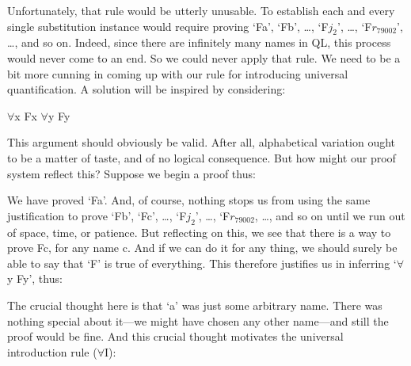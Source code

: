 Unfortunately, that rule would be utterly unusable. To establish each and every single substitution instance would require proving ‘Fa’, ‘Fb’, \ldots , ‘F$j_2$’, \ldots , ‘F$r_{79002}$’, \ldots , and so on. Indeed, since there are infinitely many names in QL, this process would never come to an end. So we could never apply that rule. We need to be a bit more cunning in coming up with our rule for introducing universal quantification. A solution will be inspired by considering:
\begin{center}
$\forall$x Fx \therefore  $\forall$y Fy
\end{center}
This argument should obviously be valid. After all, alphabetical variation ought to be a matter of taste, and of no logical consequence. But how might our proof system reflect this? Suppose we begin a proof thus:
\begin{fitchproof}
\end{fitchproof}

We have proved ‘Fa’.  And, of course, nothing stops us from using the same justification to prove ‘Fb’, ‘Fc’, \ldots , ‘F$j_2$’, \ldots , ‘F$r_{79002}$, \ldots , and so on until we run out of space, time, or patience. But reflecting on this, we see that there is a way to prove Fc, for any name c. And if we can do it for any thing, we should surely be able to say that ‘F’ is true of everything. This therefore justifies us in inferring ‘$\forall$y Fy’, thus:
\begin{fitchproof}
\end{fitchproof}

The crucial thought here is that ‘a’ was just some arbitrary name. There was nothing special about it—we might have chosen any other name—and still the proof would be fine. And this crucial thought motivates the universal introduction rule ($\forall$I):


